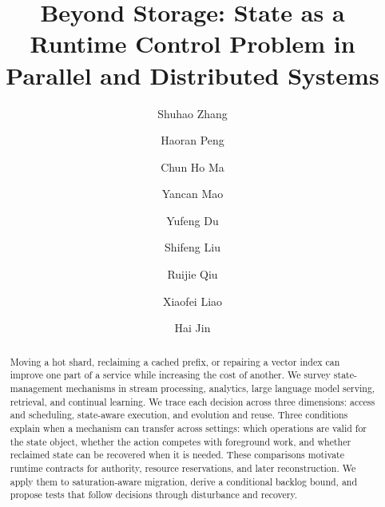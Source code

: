 \documentclass[manuscript]{acmart}
\begin{document}
\title{Beyond Storage: State as a Runtime Control Problem in Parallel and Distributed Systems}

\author{Shuhao Zhang}

\author{Haoran Peng}

\author{Chun Ho Ma}

\author{Yancan Mao}

\author{Yufeng Du}

\author{Shifeng Liu}

\author{Ruijie Qiu}

\author{Xiaofei Liao}

\author{Hai Jin}

\begin{abstract}
Moving a hot shard, reclaiming a cached prefix, or repairing a vector index can improve one part of a service while increasing the cost of another. We survey state-management mechanisms in stream processing, analytics, large language model serving, retrieval, and continual learning. We trace each decision across three dimensions: access and scheduling, state-aware execution, and evolution and reuse. Three conditions explain when a mechanism can transfer across settings: which operations are valid for the state object, whether the action competes with foreground work, and whether reclaimed state can be recovered when it is needed. These comparisons motivate runtime contracts for authority, resource reservations, and later reconstruction. We apply them to saturation-aware migration, derive a conditional backlog bound, and propose tests that follow decisions through disturbance and recovery.
\end{abstract}
\end{document}
